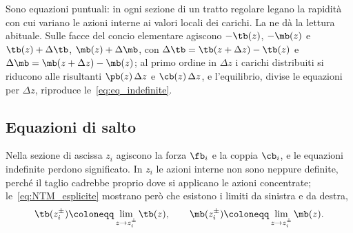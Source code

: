 Sono equazioni puntuali: in ogni sezione di un tratto
regolare legano la rapidità con cui variano le azioni
interne ai valori locali dei carichi. La
 ne dà la lettura
abituale. Sulle facce del concio elementare agiscono
$-\tb(z)$, $-\mb(z)$ e $\tb(z) + \Delta\tb$,
$\mb(z) + \Delta\mb$, con
$\Delta\tb = \tb(z + \Delta z) - \tb(z)$ e
$\Delta\mb = \mb(z + \Delta z) - \mb(z)$; al primo ordine
in $\Delta z$ i carichi distribuiti si riducono alle
risultanti $\pb(z)\,\Delta z$ e $\cb(z)\,\Delta z$,
e l'equilibrio, divise le equazioni per $\Delta z$,
riproduce le~\eqref{eq:eq_indefinite}.





\subsection{Equazioni di salto}
\label{sec:salto_singolarita}

Nella sezione di ascissa $z_i$ agiscono la forza $\fb_i$
e la coppia $\cb_i$, e le equazioni indefinite perdono
significato. In $z_i$ le azioni interne non sono neppure
definite, perché il taglio cadrebbe proprio dove si
applicano le azioni concentrate; le~\eqref{eq:NTM_esplicite}
mostrano però che esistono i limiti da sinistra e da
destra,
\begin{equation*}
	\tb(z_i^\pm) \coloneqq \lim_{z \to z_i^\pm} \tb(z),
	\qquad
	\mb(z_i^\pm) \coloneqq \lim_{z \to z_i^\pm} \mb(z).
\end{equation*}

